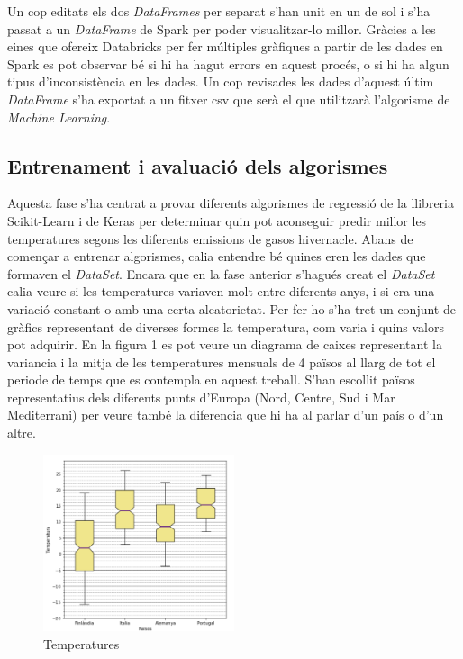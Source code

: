 \documentclass[10pt,a4paper,twocolumn,twoside]{article}
\begin{document}
Un cop editats els dos \textit{DataFrames} per separat s'han unit en un de sol i s'ha passat a un \textit{DataFrame} de Spark per poder visualitzar-lo millor. Gràcies a les eines que ofereix Databricks per fer múltiples gràfiques a partir de les dades en Spark es pot observar bé si hi ha hagut errors en aquest procés, o si hi ha algun tipus d'inconsistència en les dades. Un cop revisades les dades d'aquest últim \textit{DataFrame} s'ha exportat a un fitxer csv que serà el que utilitzarà l'algorisme de \textit{Machine Learning}.
\subsection{Entrenament i avaluació dels algorismes}
Aquesta fase s'ha centrat a provar diferents algorismes de regressió de la llibreria Scikit-Learn i de Keras per determinar quin pot aconseguir predir millor les temperatures segons les diferents emissions de gasos hivernacle. Abans de començar a entrenar algorismes, calia entendre bé quines eren les dades que formaven el \textit{DataSet}. Encara que en la fase anterior s'hagués creat el \textit{DataSet} calia veure si les temperatures variaven molt entre diferents anys, i si era una variació constant o amb una certa aleatorietat. Per fer-ho s'ha tret un conjunt de gràfics representant de diverses formes la temperatura, com varia i quins valors pot adquirir. En la figura 1 es pot veure un diagrama de caixes representant la variancia i la mitja de les temperatures mensuals de 4 països al llarg de tot el periode de temps que es contempla en aquest treball. S'han escollit països representatius dels diferents punts d'Europa (Nord, Centre, Sud i Mar Mediterrani) per veure també la diferencia que hi ha al parlar d'un país o d'un altre.
\begin{figure}[!h]
\centering
	\includegraphics[width=0.5\textwidth]{../img/tempMitjaVariacioPaisos}
	\caption{Temperatures }
	\label{fig-tempMitjaPaisos}
\end{figure}
\end{document}
